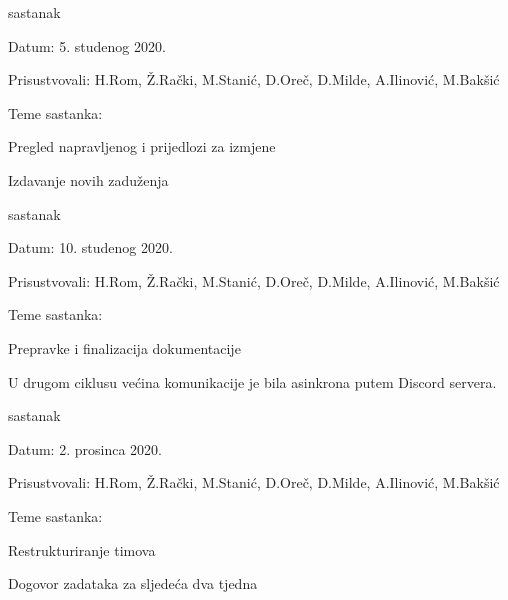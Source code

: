 \begin{packed_enum}
        	\item  sastanak 
        	\item[] \begin{packed_item}
        		\item Datum: 5. studenog 2020.
        		\item Prisustvovali: H.Rom, Ž.Rački, M.Stanić, D.Oreč, D.Milde, A.Ilinović, M.Bakšić
        		\item Teme sastanka:
        		\begin{packed_item}
        			\item  Pregled napravljenog i prijedlozi za izmjene
        			\item  Izdavanje novih zaduženja
        		\end{packed_item}
        	\end{packed_item}
        
        	\item  sastanak 
        	\item[] \begin{packed_item}
        		\item Datum: 10. studenog 2020.
        		\item Prisustvovali: H.Rom, Ž.Rački, M.Stanić, D.Oreč, D.Milde, A.Ilinović, M.Bakšić
        		\item Teme sastanka:
        		\begin{packed_item}
        			\item  Prepravke i finalizacija dokumentacije
        		\end{packed_item}
        	\end{packed_item}
        
        \text \newline \newline U drugom ciklusu većina komunikacije je bila asinkrona putem Discord servera. \newline
		
		    \item  sastanak
		    \item[] \begin{packed_item}
		    	\item Datum: 2. prosinca 2020.
		    	\item Prisustvovali: H.Rom, Ž.Rački, M.Stanić, D.Oreč, D.Milde, A.Ilinović, M.Bakšić
		    	\item Teme sastanka:
		    	\begin{packed_item}
		    		\item  Restrukturiranje timova
		    		\item  Dogovor zadataka za sljedeća dva tjedna
		    	\end{packed_item}
		    \end{packed_item}
			

\end{packed_enum}
